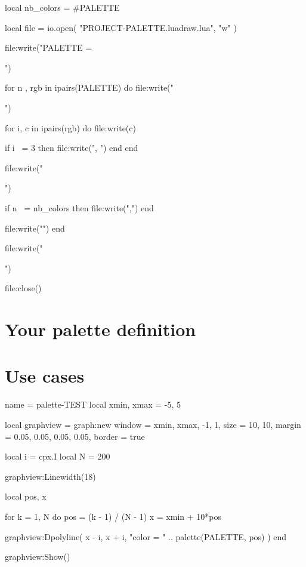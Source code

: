 \begin{luacode*}
local nb_colors = #PALETTE

local file = io.open(
  "PROJECT-PALETTE.luadraw.lua",
  "w"
)

file:write("PALETTE = {\n")

for n , rgb in ipairs(PALETTE) do
  file:write("  {")

  for i, c in ipairs(rgb) do
    file:write(c)

    if i ~= 3 then
      file:write(", ")
    end
  end

  file:write("}")

  if n ~= nb_colors then
    file:write(",")
  end

  file:write("\n")
end

file:write("}\n")

file:close()
\end{luacode*}



\section*{Your palette definition}



 \section*{Use cases}

 \centering

 \begin{luadraw}{name = palette-TEST}
 local xmin, xmax = -5, 5

 local graphview = graph:new{
   window = {xmin, xmax, -1, 1},
   size   = {10, 10},
   margin = {0.05, 0.05, 0.05, 0.05},
   border = true
 }

 local i = cpx.I
 local N = 200

 graphview:Linewidth(18)

 local pos, x

 for k = 1, N do
   pos = (k - 1) / (N - 1)
   x   = xmin + 10*pos

   graphview:Dpolyline(
     {x - i, x + i},
     "color = " .. palette(PALETTE, pos)
   )
 end

 graphview:Show()
 \end{luadraw}


 \bigskip


